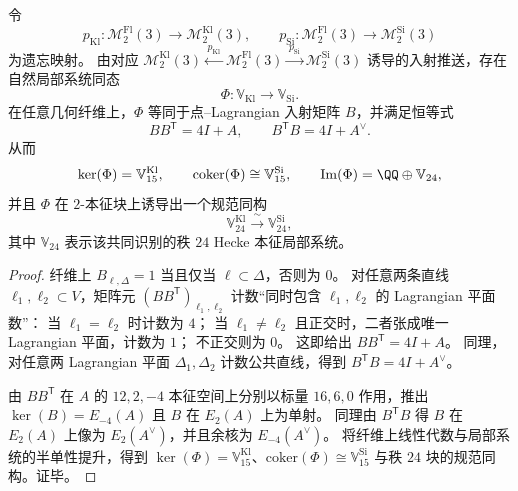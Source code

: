 \begin{theorem}\label{thm:conclusion-m2-level3-incidence-24-identification-kill-minus4}
令
\[
p_{\mathrm{Kl}}:\mathcal M_2^{\mathrm{Fl}}(3)\to\mathcal M_2^{\mathrm{Kl}}(3),
\qquad
p_{\mathrm{Si}}:\mathcal M_2^{\mathrm{Fl}}(3)\to\mathcal M_2^{\mathrm{Si}}(3)
\]
为遗忘映射。
由对应 \(\mathcal M_2^{\mathrm{Kl}}(3)\xleftarrow{\,p_{\mathrm{Kl}}\,}\mathcal M_2^{\mathrm{Fl}}(3)\xrightarrow{\,p_{\mathrm{Si}}\,}\mathcal M_2^{\mathrm{Si}}(3)\) 诱导的入射推送，存在自然局部系统同态
\[
\Phi:\mathbb V_{\mathrm{Kl}}\longrightarrow \mathbb V_{\mathrm{Si}}.
\]
在任意几何纤维上，\(\Phi\) 等同于点--Lagrangian 入射矩阵 \(B\)，并满足恒等式
\[
BB^{\mathsf T}=4I + A,\qquad B^{\mathsf T}B=4I + A^\vee.
\]
从而
\[
\ker(\Phi)=\mathbb V_{15}^{\mathrm{Kl}},
\qquad
\mathrm{coker}(\Phi)\cong \mathbb V_{15}^{\mathrm{Si}},
\qquad
\mathrm{Im}(\Phi)=\QQ\oplus \mathbb V_{24},
\]
并且 \(\Phi\) 在 \(2\)-本征块上诱导出一个规范同构
\[
\mathbb V_{24}^{\mathrm{Kl}}\xrightarrow{\ \sim\ }\mathbb V_{24}^{\mathrm{Si}},
\]
其中 \(\mathbb V_{24}\) 表示该共同识别的秩 \(24\) Hecke 本征局部系统。
\end{theorem}
\begin{proof}
纤维上 \(B_{\ell,\Delta}=1\) 当且仅当 \(\ell\subset \Delta\)，否则为 \(0\)。
对任意两条直线 \(\ell_1,\ell_2\subset V\)，矩阵元 \((BB^{\mathsf T})_{\ell_1,\ell_2}\) 计数“同时包含 \(\ell_1,\ell_2\) 的 Lagrangian 平面数”：
当 \(\ell_1=\ell_2\) 时计数为 \(4\)；
当 \(\ell_1\neq \ell_2\) 且正交时，二者张成唯一 Lagrangian 平面，计数为 \(1\)；
不正交则为 \(0\)。
这即给出 \(BB^{\mathsf T}=4I+A\)。
同理，对任意两 Lagrangian 平面 \(\Delta_1,\Delta_2\) 计数公共直线，得到 \(B^{\mathsf T}B=4I+A^\vee\)。
\par
由 \(BB^{\mathsf T}\) 在 \(A\) 的 \(12,2,-4\) 本征空间上分别以标量 \(16,6,0\) 作用，推出
\(
\ker(B)=E_{-4}(A)
\)
且 \(B\) 在 \(E_{2}(A)\) 上为单射。
同理由 \(B^{\mathsf T}B\) 得 \(B\) 在 \(E_{2}(A)\) 上像为 \(E_{2}(A^\vee)\)，并且余核为 \(E_{-4}(A^\vee)\)。
将纤维上线性代数与局部系统的半单性提升，得到 \(\ker(\Phi)=\mathbb V_{15}^{\mathrm{Kl}}\)、\(\mathrm{coker}(\Phi)\cong \mathbb V_{15}^{\mathrm{Si}}\) 与秩 \(24\) 块的规范同构。证毕。
\end{proof}


